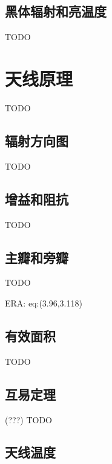 \subsection{黑体辐射和亮温度}

TODO


\section{天线原理}
\label{sec:antenna}

TODO

\subsection{辐射方向图}

TODO

\subsection{增益和阻抗}

TODO

\subsection{主瓣和旁瓣}

TODO

ERA: eq:(3.96,3.118)

\subsection{有效面积}

TODO

\subsection{互易定理}

(???) TODO

\subsection{天线温度}

